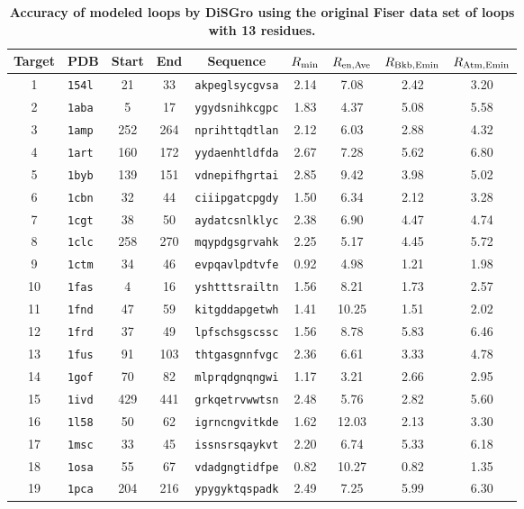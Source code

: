 \begin{table}[!h]
\caption{\bf{Accuracy of modeled loops by {\sc DiSGro} using the
original Fiser data set of loops with 13 residues.}}
  \begin{tabular}{|c|l|c|c|c|c|c|c|c|}
  \hline
  Target &  PDB & Start & End & Sequence & $R_{\rm min}$ & $R_{\rm en,Ave}$ & $R_{\rm Bkb,Emin}$ & $R_{\rm Atm,Emin}$\\
  \hline
  1 & {\tt 154l} & 21 & 33 & {\tt akpeglsycgvsa} & 2.14 & 7.08 & 2.42 & 3.20\\
  2 & {\tt 1aba} & 5 & 17 & {\tt ygydsnihkcgpc} & 1.83 & 4.37 & 5.08 & 5.58\\
  3 & {\tt 1amp} & 252 & 264 & {\tt nprihttqdtlan} & 2.12 & 6.03 & 2.88 & 4.32\\
  4 & {\tt 1art} & 160 & 172 & {\tt yydaenhtldfda} & 2.67 & 7.28 & 5.62 & 6.80\\
  5 & {\tt 1byb} & 139 & 151 & {\tt vdnepifhgrtai} & 2.85 & 9.42 & 3.98 & 5.02\\
  6 & {\tt 1cbn} & 32 & 44 & {\tt ciiipgatcpgdy} & 1.50 & 6.34 & 2.12 & 3.28\\
  7 & {\tt 1cgt} & 38 & 50 & {\tt aydatcsnlklyc} & 2.38 & 6.90 & 4.47 & 4.74\\
  8 & {\tt 1clc} & 258 & 270 & {\tt mqypdgsgrvahk} & 2.25 & 5.17 & 4.45 & 5.72\\
  9 & {\tt 1ctm} & 34 & 46 & {\tt evpqavlpdtvfe} & 0.92 & 4.98 & 1.21 & 1.98\\
  10 & {\tt 1fas} & 4 & 16 & {\tt yshtttsrailtn} & 1.56 & 8.21 & 1.73 & 2.57\\
  11 & {\tt 1fnd} & 47 & 59 & {\tt kitgddapgetwh} & 1.41 & 10.25 & 1.51 & 2.02\\
  12 & {\tt 1frd} & 37 & 49 & {\tt lpfschsgscssc} & 1.56 & 8.78 & 5.83 & 6.46\\
  13 & {\tt 1fus} & 91 & 103 & {\tt thtgasgnnfvgc} & 2.36 & 6.61 & 3.33 & 4.78\\
  14 & {\tt 1gof} & 70 & 82 & {\tt mlprqdgnqngwi} & 1.17 & 3.21 & 2.66 & 2.95\\
  15 & {\tt 1ivd} & 429 & 441 & {\tt grkqetrvwwtsn} & 2.48 & 5.76 & 2.82 & 5.60\\
  16 & {\tt 1l58} & 50 & 62 & {\tt igrncngvitkde} & 1.62 & 12.03 & 2.13 & 3.30\\
  17 & {\tt 1msc} & 33 & 45 & {\tt issnsrsqaykvt} & 2.20 & 6.74 & 5.33 & 6.18\\
  18 & {\tt 1osa} & 55 & 67 & {\tt vdadgngtidfpe} & 0.82 & 10.27 & 0.82 & 1.35\\
  19 & {\tt 1pca} & 204 & 216 & {\tt ypygyktqspadk} & 2.49 & 7.25 & 5.99 & 6.30\\

\end{tabular}
\end{table}
